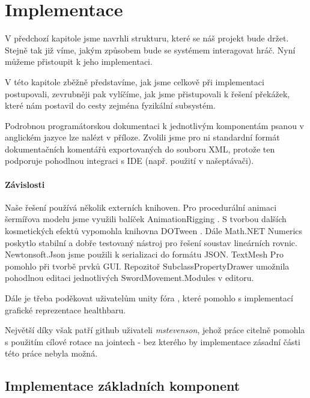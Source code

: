 \chapter{Implementace}

V předchozí kapitole jsme navrhli strukturu, které se náš projekt bude držet. Stejně tak již víme, jakým způsobem bude se systémem interagovat hráč. Nyní můžeme přistoupit k jeho implementaci.

V této kapitole zběžně představíme, jak jsme celkově při implementaci postupovali, zevrubněji pak vylíčíme, jak jsme přistupovali k řešení překážek, které nám postavil do cesty zejména fyzikální subsystém. 

Podrobnou programátorskou dokumentaci k jednotlivým komponentám psanou v anglickém jazyce lze nalézt v příloze. Zvolili jsme pro ni standardní formát dokumentačních komentářů exportovaných do souboru XML, protože ten podporuje pohodlnou integraci s IDE (např. použití v našeptávači).

\subsubsection*{Závislosti}
Naše řešení používá několik externích knihoven. Pro procedurální animaci šermířova modelu jsme využili balíček AnimationRigging \cite{AnimationRigging}. S tvorbou dalších kosmetických efektů vypomohla knihovna DOTween \cite{DoTween}. Dále Math.NET Numerics \cite{MathDotNetNumerics} poskytlo stabilní a dobře testovaný nástroj pro řešení soustav lineárních rovnic. Newtonsoft.Json \cite{NewtonsoftJson} jsme použili k serializaci do formátu JSON. TextMesh Pro \cite{TextMeshPro} pomohlo při tvorbě prvků GUI. Repozitoř SubclassPropertyDrawer \cite{SubclassPropertyDrawer} umožnila pohodlnou editaci jednotlivých SwordMovement.Modules v editoru. 

Dále je třeba poděkovat uživatelům unity fóra \cite{InvertReverseUIMask}, které pomohlo s implementací grafické reprezentace healthbaru.

Největší díky však patří github uživateli \textit{mstevenson}, jehož práce \cite{ConfigurableJointExtensions} citelně pomohla s použitím cílové rotace na jointech - bez kterého by implementace zásadní části této práce nebyla možná.


\section{Implementace základních komponent}

